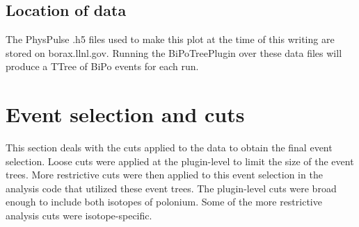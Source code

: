 \subsection{Location of data}
The PhysPulse .h5 files used to make this plot at the time of this writing are stored on borax.llnl.gov. Running the BiPoTreePlugin over these data files will produce a TTree of BiPo events for each run. 

\section{Event selection and cuts\label{sec:cuts}}
This section deals with the cuts applied to the data to obtain the final event selection. Loose cuts were applied at the plugin-level to limit the size of the event trees. More restrictive cuts were then applied to this event selection in the analysis code that utilized these event trees. The plugin-level cuts were broad enough to include both isotopes of polonium. Some of the more restrictive analysis cuts were isotope-specific.
